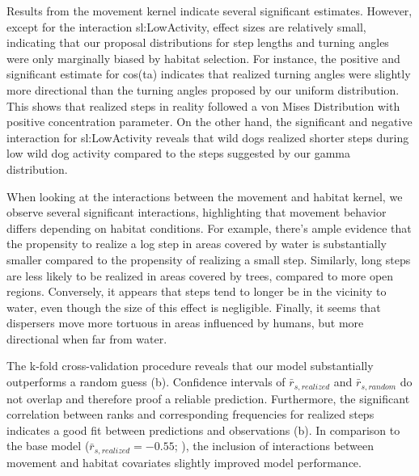 \documentclass[abstract=on,10pt,a4paper,bibliography=totocnumbered]{article}
\begin{document}
Results from the movement kernel indicate several significant estimates.
However, except for the interaction \textsf{sl:LowActivity}, effect sizes are
relatively small, indicating that our proposal distributions for step lengths
and turning angles were only marginally biased by habitat selection. For
instance, the positive and significant estimate for \textsf{cos(ta)} indicates
that realized turning angles were slightly more directional than the turning
angles proposed by our uniform distribution. This shows that realized steps in
reality followed a von Mises Distribution with positive concentration parameter.
On the other hand, the significant and negative interaction for
\textsf{sl:LowActivity} reveals that wild dogs realized shorter steps during low
wild dog activity compared to the steps suggested by our gamma distribution.

When looking at the interactions between the movement and habitat kernel, we
observe several significant interactions, highlighting that movement behavior
differs depending on habitat conditions. For example, there's ample evidence
that the propensity to realize a log step in areas covered by water is
substantially smaller compared to the propensity of realizing a small step.
Similarly, long steps are less likely to be realized in areas covered by trees,
compared to more open regions. Conversely, it appears that steps tend to longer
be in the vicinity to water, even though the size of this effect is negligible.
Finally, it seems that dispersers move more tortuous in areas influenced by
humans, but more directional when far from water.

The k-fold cross-validation procedure reveals that our model substantially
outperforms a random guess (b). Confidence intervals of
\(\bar{r}_{s, realized}\) and \(\bar{r}_{s, random}\) do not overlap and
therefore proof a reliable prediction. Furthermore, the significant correlation
between ranks and corresponding frequencies for realized steps indicates a good
fit between predictions and observations (b). In comparison
to the base model (\(\bar{r}_{s, realized} = -0.55\); \citealp{Hofmann.2021}),
the inclusion of interactions between movement and habitat covariates slightly
improved model performance.
\end{document}

